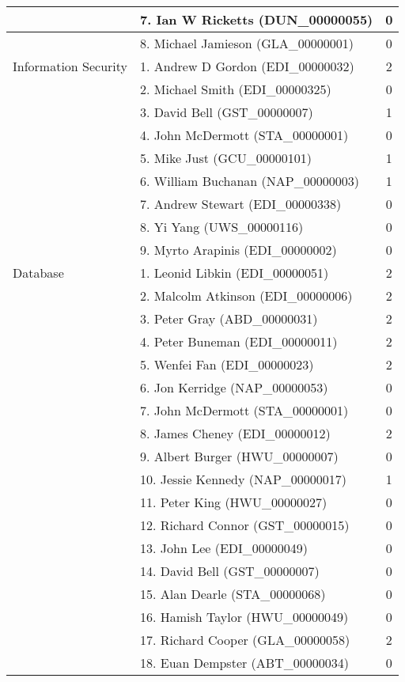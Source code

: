 \begin{longtable}{|l|l|c|}
\hline  & 7. Ian W Ricketts (DUN\_00000055) & 0 \\
\hline  & 8. Michael Jamieson (GLA\_00000001) & 0 \\
\hline Information Security & 1. Andrew D Gordon (EDI\_00000032) & 2 \\
\hline  & 2. Michael Smith (EDI\_00000325) & 0 \\
\hline  & 3. David Bell (GST\_00000007) & 1 \\
\hline  & 4. John McDermott (STA\_00000001) & 0 \\
\hline  & 5. Mike Just (GCU\_00000101) & 1 \\
\hline  & 6. William Buchanan (NAP\_00000003) & 1 \\
\hline  & 7. Andrew Stewart (EDI\_00000338) & 0 \\
\hline  & 8. Yi Yang (UWS\_00000116) & 0 \\
\hline  & 9. Myrto Arapinis (EDI\_00000002) & 0 \\
\hline Database & 1. Leonid Libkin (EDI\_00000051) & 2 \\
\hline  & 2. Malcolm Atkinson (EDI\_00000006) & 2 \\
\hline  & 3. Peter Gray (ABD\_00000031) & 2 \\
\hline  & 4. Peter Buneman (EDI\_00000011) & 2 \\
\hline  & 5. Wenfei Fan (EDI\_00000023) & 2 \\
\hline  & 6. Jon Kerridge (NAP\_00000053) & 0 \\
\hline  & 7. John McDermott (STA\_00000001) & 0 \\
\hline  & 8. James Cheney (EDI\_00000012) & 2 \\
\hline  & 9. Albert Burger (HWU\_00000007) & 0 \\
\hline  & 10. Jessie Kennedy (NAP\_00000017) & 1 \\
\hline  & 11. Peter King (HWU\_00000027) & 0 \\
\hline  & 12. Richard Connor (GST\_00000015) & 0 \\
\hline  & 13. John Lee (EDI\_00000049) & 0 \\
\hline  & 14. David Bell (GST\_00000007) & 0 \\
\hline  & 15. Alan Dearle (STA\_00000068) & 0 \\
\hline  & 16. Hamish Taylor (HWU\_00000049) & 0 \\
\hline  & 17. Richard Cooper (GLA\_00000058) & 2 \\
\hline  & 18. Euan Dempster (ABT\_00000034) & 0 \\

\end{longtable}

